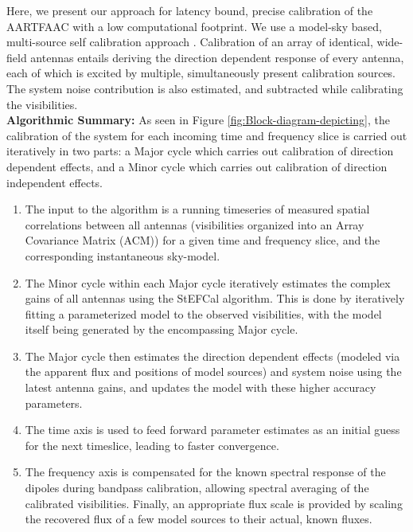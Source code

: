 \documentclass{aa}
\begin{document}
Here,  we present our  approach for  latency bound,  precise calibration  of the
AARTFAAC  with  a  low  computational  footprint.  We  use  a  model-sky  based,
multi-source   self   calibration   approach   \citep{wijnholds2009multisource}.
Calibration of an  array of identical, wide-field antennas  entails deriving the
direction  dependent response  of every  antenna, each  of which  is  excited by
multiple,  simultaneously   present  calibration  sources.    The  system  noise
contribution   is  also   estimated,  and   subtracted  while   calibrating  the
visibilities.\\    \textbf{Algorithmic    Summary:}    As   seen    in    Figure
\ref{fig:Block-diagram-depicting},  the  calibration  of  the  system  for  each
incoming time  and frequency slice  is carried out  iteratively in two  parts: a
Major cycle which carries out  calibration of direction dependent effects, and a
Minor cycle which carries out calibration of direction independent effects.
\begin {enumerate}
\item {The  input to the algorithm  is a running timeseries  of measured spatial
  correlations  between  all  antennas  (visibilities organized  into  an  Array
  Covariance  Matrix  (ACM)) for  a  given time  and  frequency  slice, and  the
  corresponding instantaneous sky-model.}
\item {The Minor cycle within each Major cycle iteratively estimates the complex
  gains  of all  antennas using  the StEFCal  \citep{salvini2013stef} algorithm.
  This  is done by  iteratively fitting  a parameterized  model to  the observed
  visibilities, with the model itself  being generated by the encompassing Major
  cycle.}
\item {The Major  cycle then estimates the direction  dependent effects (modeled
  via the apparent  flux and positions of model sources)  and system noise using
  the latest  antenna gains,  and updates the  model with these  higher accuracy
  parameters.}
\item {The time  axis is used to feed forward parameter  estimates as an initial
  guess for the next timeslice, leading to faster convergence.}
\item {The frequency axis is compensated for the known spectral response of the dipoles during bandpass calibration, allowing spectral averaging of the calibrated visibilities. Finally, an appropriate flux scale is provided by scaling the recovered flux of a few model sources to their actual, known fluxes.}
\end{enumerate}
\end{document}

